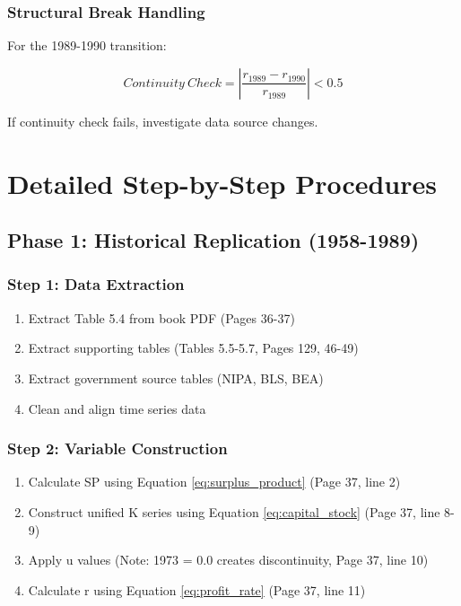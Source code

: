 \documentclass[12pt,a4paper]{article}
\begin{document}
\subsubsection{Structural Break Handling}
For the 1989-1990 transition:

\begin{equation}
Continuity\ Check = \left| \frac{r_{1989} - r_{1990}}{r_{1989}} \right| < 0.5
\label{eq:continuity_check}
\end{equation}

If continuity check fails, investigate data source changes.

\section{Detailed Step-by-Step Procedures}

\subsection{Phase 1: Historical Replication (1958-1989)}

\subsubsection{Step 1: Data Extraction}
\begin{enumerate}
    \item Extract Table 5.4 from book PDF (Pages 36-37)
    \item Extract supporting tables (Tables 5.5-5.7, Pages 129, 46-49)
    \item Extract government source tables (NIPA, BLS, BEA)
    \item Clean and align time series data
\end{enumerate}

\subsubsection{Step 2: Variable Construction}
\begin{enumerate}
    \item Calculate SP using Equation \ref{eq:surplus_product} (Page 37, line 2)
    \item Construct unified K series using Equation \ref{eq:capital_stock} (Page 37, line 8-9)
    \item Apply u values (Note: 1973 = 0.0 creates discontinuity, Page 37, line 10)
    \item Calculate r using Equation \ref{eq:profit_rate} (Page 37, line 11)
\end{enumerate}
\end{document}
